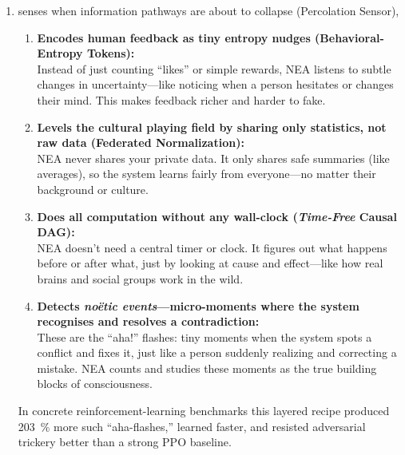 \documentclass[11pt]{article}
\begin{document}
\begin{enumerate}[itemsep=1pt,label=\textbf{L\arabic*})]
  \item senses when information pathways are about to collapse
        (Percolation Sensor),
 \begin{enumerate}[itemsep=2pt]
  \item \textbf{Encodes human feedback as tiny entropy nudges (Behavioral-Entropy Tokens):} \\
  Instead of just counting “likes” or simple rewards, NEA listens to subtle changes in uncertainty—like noticing when a person hesitates or changes their mind. This makes feedback richer and harder to fake.

  \item \textbf{Levels the cultural playing field by sharing only statistics, not raw data (Federated Normalization):} \\
  NEA never shares your private data. It only shares safe summaries (like averages), so the system learns fairly from everyone—no matter their background or culture.

  \item \textbf{Does all computation without any wall-clock (\emph{Time-Free} Causal DAG):} \\
  NEA doesn’t need a central timer or clock. It figures out what happens before or after what, just by looking at cause and effect—like how real brains and social groups work in the wild.

  \item \textbf{Detects \emph{no\"etic events}—micro-moments where the system recognises and resolves a contradiction:} \\
  These are the “aha!” flashes: tiny moments when the system spots a conflict and fixes it, just like a person suddenly realizing and correcting a mistake. NEA counts and studies these moments as the true building blocks of consciousness.
\end{enumerate}

In concrete reinforcement-learning benchmarks this layered recipe
produced \SI{203}{\percent} more such ``aha-flashes,'' learned faster,
and resisted adversarial trickery better than a strong PPO baseline.


\end{enumerate}
\end{document}
